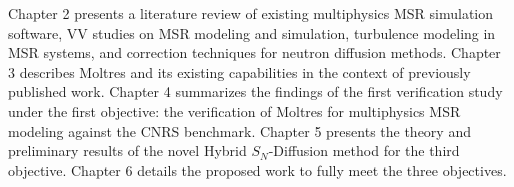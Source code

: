 Chapter 2 presents a literature review of existing multiphysics \gls{MSR} simulation software,
\gls{VV} studies on \gls{MSR} modeling and simulation, turbulence modeling in \gls{MSR} systems,
and correction techniques for neutron diffusion methods.
Chapter 3 describes Moltres and its existing capabilities in the context of previously published
work.
Chapter 4 summarizes the findings of the first verification study under the first objective: the
verification of Moltres for multiphysics \gls{MSR} modeling against the CNRS benchmark.
Chapter 5 presents the theory and preliminary results of the novel Hybrid $S_N$-Diffusion
method for the third objective.
Chapter 6 details the proposed work to fully meet the three objectives.
